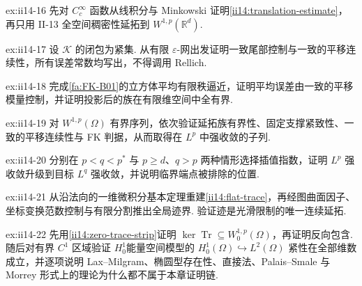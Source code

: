 \begin{FAExercise}[平移估计]{ex:ii14-16}
先对 \(\displaystyle C_c^\infty\) 函数从线积分与 Minkowski 证明\autoref{ii14:translation-estimate}，再只用 II-13 全空间稠密性延拓到 \(\displaystyle W^{1,p}(\mathbb R^d)\).
\end{FAExercise}

\begin{FAExercise}{ex:ii14-17}
设 \(\displaystyle\mathcal K\) 的闭包为紧集. 从有限 \(\displaystyle\varepsilon\)-网出发证明一致尾部控制与一致的平移连续性，所有误差常数均写出，不得调用 Rellich.
\end{FAExercise}

\begin{FAExercise}{ex:ii14-18}
完成\autoref{fa:FK-B01}的立方体平均有限秩逼近，证明平均误差由一致的平移模量控制，并证明投影后的族在有限维空间中全有界.
\end{FAExercise}

\begin{FAExercise}{ex:ii14-19}
对 \(\displaystyle W^{1,p}(\Omega)\) 有界序列，依次验证延拓族有界性、固定支撑紧致性、一致的平移连续性与 FK 判据，从而取得在 \(\displaystyle L^p\) 中强收敛的子列.
\end{FAExercise}

\begin{FAExercise}{ex:ii14-20}
分别在 \(\displaystyle p<q<p^*\) 与 \(\displaystyle p\geqslant d\)、\(\displaystyle q>p\) 两种情形选择插值指数，证明 \(\displaystyle L^p\) 强收敛升级到目标 \(\displaystyle L^q\) 强收敛，并说明临界端点被排除的位置.
\end{FAExercise}

\begin{FAExercise}[迹估计]{ex:ii14-21}
从沿法向的一维微积分基本定理重建\autoref{ii14:flat-trace}，再经图曲面因子、坐标变换范数控制与有限分割推出全局迹界. 验证迹是光滑限制的唯一连续延拓.
\end{FAExercise}

\begin{FAExercise}{ex:ii14-22}
先用\autoref{ii14:zero-trace-strip}证明 \(\displaystyle\ker\operatorname{Tr}\subseteq W_0^{1,p}(\Omega)\)，再证明反向包含. 随后对有界 \(\displaystyle C^1\) 区域验证 \(\displaystyle H_0^1\)能量空间模型的 \(\displaystyle H_0^1(\Omega)\hookrightarrow L^2(\Omega)\) 紧性在全部维数成立，并逐项说明 Lax--Milgram、椭圆型存在性、直接法、Palais--Smale 与 Morrey 形式上的理论为什么都不属于本章证明链.
\end{FAExercise}
